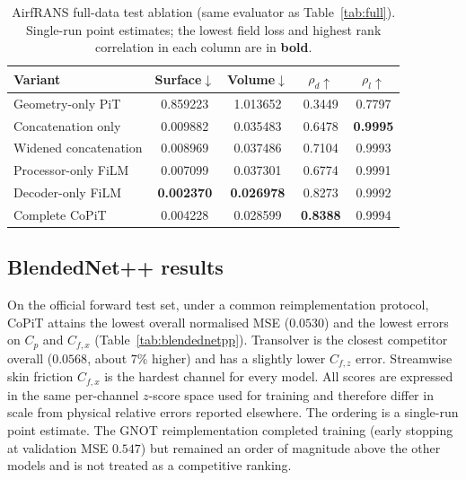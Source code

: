 \documentclass[final,3p,times]{elsarticle}
\begin{document}
\begin{table}[H]
\caption{AirfRANS full-data test ablation (same evaluator as Table~\ref{tab:full}). Single-run point estimates; the lowest field loss and highest rank correlation in each column are in \textbf{bold}.}
\label{tab:ablate_air}
\centering\footnotesize
\begin{tabular}{@{}lcccc@{}}
\toprule
Variant & Surface$\downarrow$ & Volume$\downarrow$ & $\rho_d\uparrow$ & $\rho_l\uparrow$ \\
\midrule
Geometry-only PiT & 0.859223 & 1.013652 & 0.3449 & 0.7797 \\
Concatenation only & 0.009882 & 0.035483 & 0.6478 & \textbf{0.9995} \\
Widened concatenation & 0.008969 & 0.037486 & 0.7104 & 0.9993 \\
Processor-only FiLM & 0.007099 & 0.037301 & 0.6774 & 0.9991 \\
Decoder-only FiLM & \textbf{0.002370} & \textbf{0.026978} & 0.8273 & 0.9992 \\
Complete CoPiT & 0.004228 & 0.028599 & \textbf{0.8388} & 0.9994 \\
\bottomrule
\end{tabular}
\end{table}

\subsection{BlendedNet++ results}
\label{sec:blended}

On the official forward test set, under a common reimplementation protocol, CoPiT attains the lowest overall normalised MSE ($0.0530$) and the lowest errors on $C_{p}$ and $C_{f,x}$ (Table~\ref{tab:blendednetpp}). Transolver is the closest competitor overall ($0.0568$, about $7\%$ higher) and has a slightly lower $C_{f,z}$ error. Streamwise skin friction $C_{f,x}$ is the hardest channel for every model. All scores are expressed in the same per-channel $z$-score space used for training and therefore differ in scale from physical relative errors reported elsewhere. The ordering is a single-run point estimate. The GNOT reimplementation completed training (early stopping at validation MSE $0.547$) but remained an order of magnitude above the other models and is not treated as a competitive ranking.
\end{document}
